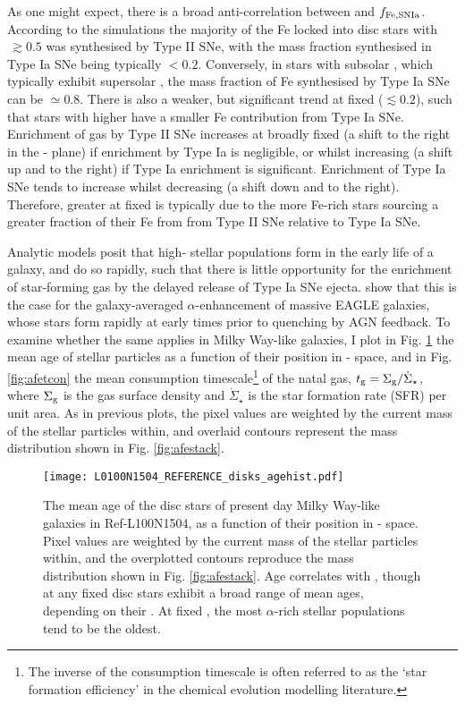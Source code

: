As one might expect, there is a broad anti-correlation between \afe{} and $f_{\rm Fe,SNIa}$. According to the simulations the majority of the Fe locked into disc stars with \afe{}$\,\gtrsim 0.5$ was synthesised by Type II SNe, with the mass fraction synthesised in Type Ia SNe being typically $< 0.2$. Conversely, in stars with subsolar \afe{}, which typically exhibit supersolar \feh{}, the mass fraction of Fe synthesised by Type Ia SNe can be $\simeq 0.8$. There is also a weaker, but significant trend at fixed \afe{} ($\lesssim 0.2$), such that stars with higher \feh{} have a smaller Fe contribution from Type Ia SNe. Enrichment of gas by Type II SNe increases \feh{} at broadly fixed \afe{} (a shift to the right in the \afe{}-\feh{} plane) if enrichment by Type Ia is negligible, or whilst increasing \afe{} (a shift up and to the right) if Type Ia enrichment is significant. Enrichment of Type Ia SNe tends to increase \feh{} whilst decreasing \afe{} (a shift down and to the right). Therefore, greater \feh{} at fixed \afe{} is typically due to the more Fe-rich stars sourcing a greater fraction of their Fe from from Type II SNe relative to Type Ia SNe. 

Analytic models posit that high-\afe{} stellar populations form in the early life of a galaxy, and do so rapidly, such that there is little opportunity for the enrichment of star-forming gas by the delayed release of Type Ia SNe ejecta. \citet{2016MNRAS.461L.102S} show that this is the case for the galaxy-averaged $\alpha$-enhancement of massive EAGLE galaxies, whose stars form rapidly at early times prior to quenching by AGN feedback. To examine whether the same applies in Milky Way-like galaxies, I plot in Fig. \ref{fig:afeages} the mean age of stellar particles as a function of their position in \afe{}-\feh{} space, and in Fig. \ref{fig:afetcon} the mean consumption timescale\footnote{The inverse of the consumption timescale is often referred to as the `star formation efficiency' in the chemical evolution modelling literature.} of the natal gas, $t_{\rm g} = \Sigma_{\rm g}/\dot{\Sigma}_\star$, where $\Sigma_{\rm g}$ is the gas surface density and $\dot{\Sigma}_\star$ is the star formation rate (SFR) per unit area. As in previous plots, the pixel values are weighted by the current mass of the stellar particles within, and overlaid contours represent the mass distribution shown in Fig. \ref{fig:afestack}. 

\begin{figure}
\texttt{[image: L0100N1504\_REFERENCE\_disks\_agehist.pdf]}
\caption[Mean stellar age as a function of \afe{} and \feh{} for disc stars in Ref-L100N1504]{\label{fig:afeages} The mean age of the disc stars of present day Milky Way-like galaxies in Ref-L100N1504, as a function of their position in \afe{}-\feh{} space. Pixel values are weighted by the current mass of the stellar particles within, and the overplotted contours reproduce the mass distribution shown in Fig. \ref{fig:afestack}. Age correlates with \afe{}, though at any fixed \afe{} disc stars exhibit a broad range of mean ages, depending on their \feh{}. At fixed \feh{}, the most $\alpha$-rich stellar populations tend to be the oldest.}
\end{figure}

